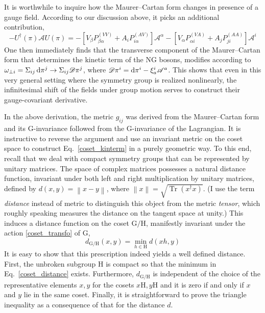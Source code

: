 \documentclass[final,2p,times,12pt,sort&compress]{elsarticle}
\newcommand\gr[1]{\mathrm{#1}}              %
\newcommand\DD{\mathscr{D}}                 %
\newcommand\AAA{\mathscr{A}}                %
\newcommand\he[1]{#1^{\dagger}}             %
\newcommand\nor[1]{\left\|#1\right\|}       %
\newcommand\dd{\mathop{{\rm d}\!}\nolimits} %
\DeclareMathOperator{\Tr}{Tr}
\begin{document}
It is worthwhile to inquire how the Maurer--Cartan form changes in presence
of a gauge field. According to our discussion above, it picks an additional
contribution,
\begin{equation}
-\he U(\pi)\AAA U(\pi)= -\left[V_\beta
P^{(VV)}_{\beta\alpha}+A_iP^{(AV)}_{i\alpha}\right]\AAA^\alpha -\left[V_\alpha
P^{(VA)}_{\alpha i}+A_jP^{(AA)}_{ji}\right]\AAA^i
\label{gauged_Maurer}
\end{equation}
One then immediately finds that the transverse component of the Maurer--Cartan
form that determines the kinetic term of the NG bosons, modifies according to
$\omega_{\perp i}=\Sigma_{ij}\dd\pi^j\to\Sigma_{ij}\DD\pi^j$, where
$\DD\pi^i=\dd\pi^i-\xi^i_a\AAA^a$. This shows that even in this very general
setting where the symmetry group is realized nonlinearly, the infinitesimal
shift of the fields under group motion serves to construct their
gauge-covariant derivative.

In the above derivation, the metric $g_{ij}$ was derived from the
Maurer--Cartan form and its $\gr G$-invariance followed from the $\gr
G$-invariance of the Lagrangian. It is instructive to reverse the argument and
use an invariant metric on the coset space to construct
Eq.~\eqref{coset_kinterm} in a purely geometric way. To this end, recall that
we deal with compact symmetry groups that can be represented by unitary
matrices. The space of complex matrices possesses a natural distance function,
invariant under both left and right multiplication by unitary matrices, defined
by $d(x,y)=\nor{x-y}$, where $\nor x=\sqrt{\Tr(\he xx)}$. (I use the term
\emph{distance} instead of metric to distinguish this object from the metric
\emph{tensor}, which roughly speaking measures the distance on the tangent
space at unity.) This induces a distance function on the coset $\gr{G/H}$,
manifestly invariant under the action \eqref{coset_transfo} of $\gr G$,
\begin{equation}
d_{\gr{G/H}}(x,y)=\min_{h\in\gr H}d(xh,y)
\label{coset_distance}
\end{equation}
It is easy to show that this prescription indeed yields a well defined
distance. First, the unbroken subgroup $\gr H$ is compact so that the
minimum in Eq.~\eqref{coset_distance} exists. Furthermore, $d_{\gr{G/H}}$ is
independent of the choice of the representative elements $x,y$ for the cosets
$x\gr H,y\gr H$ and it is zero if and only if $x$ and $y$ lie in the same coset.
Finally, it is straightforward to prove the triangle inequality as a
consequence of that for the distance $d$.
\end{document}
